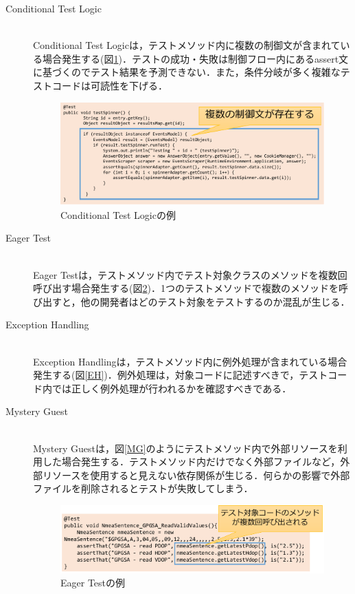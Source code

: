 \documentclass[12pt]{jarticle} %
\begin{document}
\begin{description}
\newpage
\item[Conditional Test Logic]~\\
Conditional Test Logicは，テストメソッド内に複数の制御文が含まれている場合発生する(図\ref{CTL})．テストの成功・失敗は制御フロー内にあるassert文に基づくのでテスト結果を予測できない．また，条件分岐が多く複雑なテストコードは可読性を下げる．

\begin{figure}[htbp]
  \begin{center}
    \includegraphics[clip,width=15cm]{CTL.pdf}
    \caption{Conditional Test Logicの例}
    \label{CTL}
  \end{center}
\end{figure}

\item[Eager Test]~\\
Eager Testは，テストメソッド内でテスト対象クラスのメソッドを複数回呼び出す場合発生する(図\ref{ET})．1つのテストメソッドで複数のメソッドを呼び出すと，他の開発者はどのテスト対象をテストするのか混乱が生じる．


\item[Exception Handling]~\\
Exception Handlingは，テストメソッド内に例外処理が含まれている場合発生する(図\ref{EH})．例外処理は，対象コードに記述すべきで，テストコード内では正しく例外処理が行われるかを確認すべきである．

\item[Mystery Guest]~\\
Mystery Guestは，図\ref{MG}のようにテストメソッド内で外部リソースを利用した場合発生する．テストメソッド内だけでなく外部ファイルなど，外部リソースを使用すると見えない依存関係が生じる．何らかの影響で外部ファイルを削除されるとテストが失敗してしまう．

\begin{figure}[htbp]
  \begin{center}
    \includegraphics[clip,width=15cm]{ET.pdf}
    \caption{Eager Testの例}
    \label{ET}
  \end{center}
\end{figure}


\end{description}
\end{document}
